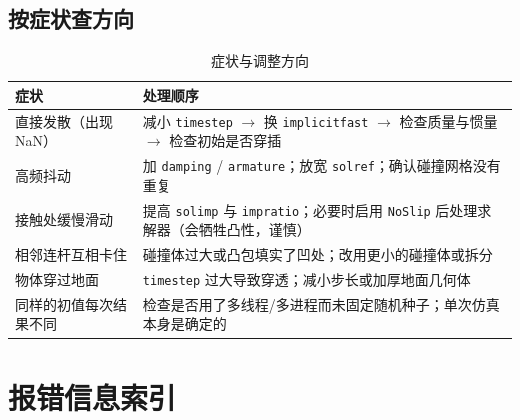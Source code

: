 \subsection{按症状查方向}

\begin{table}[H]
	\centering
	\caption{症状与调整方向}
	\label{tab:Debug:症状}
	\footnotesize
	\begin{tabular}{>{\raggedright\arraybackslash}p{4.4cm}>{\raggedright\arraybackslash}p{9.8cm}}
		\hline
		症状 & 处理顺序 \\
		\hline
		直接发散（出现 NaN） & 减小 \texttt{timestep} $\rightarrow$ 换 \texttt{implicitfast} $\rightarrow$ 检查质量与惯量 $\rightarrow$ 检查初始是否穿插 \\
		高频抖动 & 加 \texttt{damping} / \texttt{armature}；放宽 \texttt{solref}；确认碰撞网格没有重复 \\
		接触处缓慢滑动 & 提高 \texttt{solimp} 与 \texttt{impratio}；必要时启用 \texttt{NoSlip} 后处理求解器（会牺牲凸性，谨慎） \\
		相邻连杆互相卡住 & 碰撞体过大或凸包填实了凹处；改用更小的碰撞体或拆分 \\
		物体穿过地面 & \texttt{timestep} 过大导致穿透；减小步长或加厚地面几何体 \\
		同样的初值每次结果不同 & 检查是否用了多线程/多进程而未固定随机种子；单次仿真本身是确定的 \\
		\hline
	\end{tabular}
\end{table}

\section{报错信息索引}


